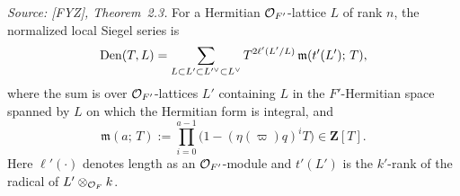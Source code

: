 \begin{theorem}
  \label{thm:cho-yamauchi}
  \textit{Source: [FYZ], Theorem~2.3.}
  For a Hermitian \(\mathcal{O}_{F'}\)-lattice \(L\) of rank \(n\), the normalized local
  Siegel series is
  \[
    \operatorname{Den}(T, L) = \sum_{L \subset L' \subset L'^\vee \subset L^\vee}
      T^{2\ell'(L'/L)}\, \mathfrak{m}(t'(L');\, T),
  \]
  where the sum is over \(\mathcal{O}_{F'}\)-lattices \(L'\) containing \(L\) in the
  \(F'\)-Hermitian space spanned by \(L\) on which the Hermitian form is integral, and
  \[
    \mathfrak{m}(a;\, T) := \prod_{i=0}^{a-1}\bigl(1 - (\eta(\varpi) q)^i T\bigr)
      \in \mathbf{Z}[T].
  \]
  Here \(\ell'(\cdot)\) denotes length as an \(\mathcal{O}_{F'}\)-module and \(t'(L')\) is the
  \(k'\)-rank of the radical of \(L' \otimes_{\mathcal{O}_F} k\).
\end{theorem}

